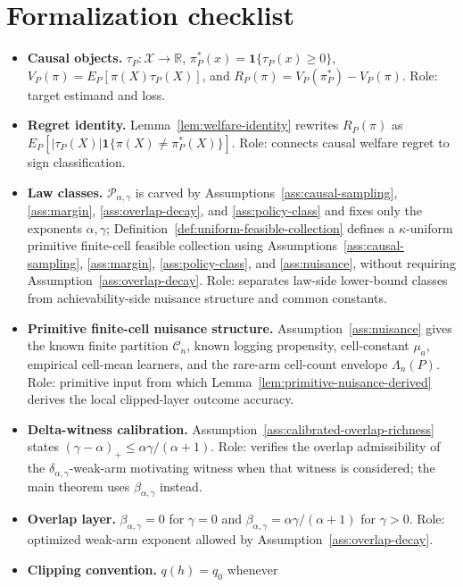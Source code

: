 \documentclass[11pt]{article}
\newcommand{\one}{\mathbf{1}}
\theoremstyle{definition}
\theoremstyle{plain}
\theoremstyle{remark}
\begin{document}
\section{Formalization checklist}
\begin{itemize}[leftmargin=*]
\item \textbf{Causal objects.}  \(\tau_P:\mathcal X\to\mathbb R\),
\(\pi_P^*(x)=\one\{\tau_P(x)\ge0\}\), \(V_P(\pi)=E_P[\pi(X)\tau_P(X)]\),
and \(R_P(\pi)=V_P(\pi_P^*)-V_P(\pi)\).  Role: target estimand and loss.
\item \textbf{Regret identity.}  Lemma~\ref{lem:welfare-identity} rewrites
\(R_P(\pi)\) as
\(E_P[|\tau_P(X)|\one\{\pi(X)\ne\pi_P^*(X)\}]\).  Role: connects causal
welfare regret to sign classification.
\item \textbf{Law classes.}  \(\mathcal P_{\alpha,\gamma}\) is carved by
Assumptions~\ref{ass:causal-sampling}, \ref{ass:margin},
\ref{ass:overlap-decay}, and \ref{ass:policy-class} and fixes only the
exponents \(\alpha,\gamma\); Definition~\ref{def:uniform-feasible-collection}
defines a \(\kappa\)-uniform primitive finite-cell feasible collection using
Assumptions~\ref{ass:causal-sampling}, \ref{ass:margin},
\ref{ass:policy-class}, and \ref{ass:nuisance}, without requiring
Assumption~\ref{ass:overlap-decay}.  Role: separates law-side lower-bound
classes from achievability-side nuisance structure and common constants.
\item \textbf{Primitive finite-cell nuisance structure.}
Assumption~\ref{ass:nuisance} gives the known finite partition
\(\mathscr C_n\), known logging propensity, cell-constant \(\mu_a\), empirical
cell-mean learners, and the rare-arm cell-count envelope \(\Lambda_n(P)\).
Role: primitive input from which Lemma~\ref{lem:primitive-nuisance-derived}
derives the local clipped-layer outcome accuracy.
\item \textbf{Delta-witness calibration.}
Assumption~\ref{ass:calibrated-overlap-richness} states
\((\gamma-\alpha)_+\le\alpha\gamma/(\alpha+1)\).  Role: verifies the
overlap admissibility of the \(\delta_{\alpha,\gamma}\)-weak-arm motivating
witness when that witness is considered; the main theorem uses
\(\beta_{\alpha,\gamma}\) instead.
\item \textbf{Overlap layer.}  \(\beta_{\alpha,\gamma}=0\) for \(\gamma=0\)
and \(\beta_{\alpha,\gamma}=\alpha\gamma/(\alpha+1)\) for \(\gamma>0\).
Role: optimized weak-arm exponent allowed by Assumption~\ref{ass:overlap-decay}.
\item \textbf{Clipping convention.}  \(q(h)=q_0\) whenever

\end{itemize}
\end{document}
